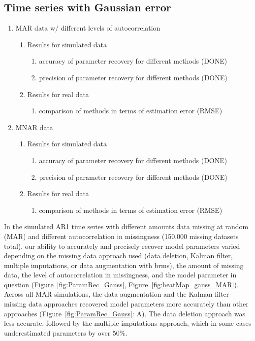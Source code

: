 \documentclass{article}
\begin{document}
\subsection*{Time series with Gaussian error}
\begin{enumerate}
    \item MAR data w/ different levels of autocorrelation
        \begin{enumerate}
            \item Results for simulated data
            \begin{enumerate}
                \item accuracy of parameter recovery for different methods (DONE) 
                \item precision of parameter recovery for different methods (DONE)
            \end{enumerate}
            \item Results for real data 
            \begin{enumerate}
                 \item comparison of methods in terms of estimation error (RMSE)
            \end{enumerate}
        \end{enumerate}
    \item MNAR data
    \begin{enumerate}
            \item Results for simulated data
            \begin{enumerate}
               \item accuracy of parameter recovery for different methods (DONE)
                \item precision of parameter recovery for different methods (DONE)
            \end{enumerate}
            \item Results for real data 
                 \begin{enumerate}
                 \item comparison of methods in terms of estimation error (RMSE)
            \end{enumerate}
        \end{enumerate}
\end{enumerate}
In the simulated AR1 time series with different amounts data missing at random (MAR) and different autocorrelation in missingness (150,000 missing datasets total), our ability to accurately and precisely recover model parameters varied depending on the missing data approach used (data deletion, Kalman filter, multiple imputations, or data augmentation with brms), the amount of missing data, the level of autocorrelation in missingness, and the model parameter in question (Figure~\ref{fig:ParamRec_Gauss}, Figure~\ref{fig:heatMap_gauss_MAR}). Across all MAR simulations, the data augmentation and the Kalman filter missing data approaches recovered model parameters more accurately than other approaches (Figure~\ref{fig:ParamRec_Gauss}: A). The data deletion approach was less accurate, followed by the multiple imputations approach, which in some cases underestimated parameters by over 50\%. 
\end{document}
